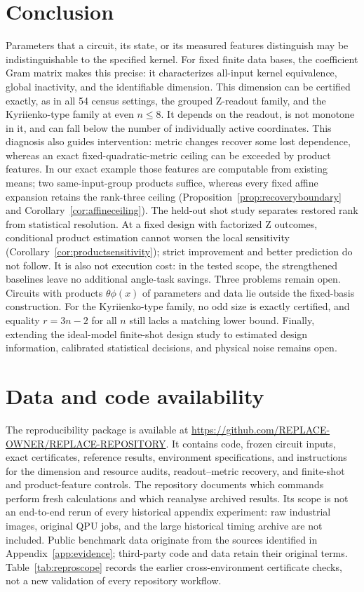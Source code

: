 \documentclass[a4paper,twocolumn,11pt,unpublished]{quantumarticle}
\begin{document}
\section{Conclusion}
Parameters that a circuit, its state, or its measured features
distinguish may be indistinguishable to the specified kernel. For
fixed finite data bases, the coefficient Gram matrix makes this
precise: it characterizes all-input kernel equivalence, global
inactivity, and the identifiable dimension. This dimension can be
certified exactly, as in all 54 census settings, the grouped Z-readout
family, and the Kyriienko-type family at even $n\le8$. It depends on
the readout, is not monotone in it, and can fall below the number of
individually active coordinates. This diagnosis also guides intervention:
metric changes recover some lost dependence, whereas an exact
fixed-quadratic-metric ceiling can be exceeded by product features.
In our exact example those features are computable from existing means;
two same-input-group products suffice, whereas every fixed affine
expansion retains the rank-three ceiling
(Proposition~\ref{prop:recoveryboundary} and Corollary~\ref{cor:affineceiling}).
The held-out shot study separates restored rank from statistical
resolution. At a fixed design with factorized Z outcomes, conditional
product estimation cannot worsen the local sensitivity
(Corollary~\ref{cor:productsensitivity}); strict improvement and better
prediction do not follow. It is also not execution cost: in the
tested scope, the strengthened baselines leave no additional
angle-task savings. Three problems remain open. Circuits with
products $\theta\phi(x)$ of parameters and data lie outside the fixed-basis
construction. For the Kyriienko-type family, no odd size is exactly
certified, and equality $r=3n-2$ for all $n$ still lacks a matching
lower bound. Finally, extending the ideal-model finite-shot design
study to estimated design information, calibrated statistical decisions,
and physical noise remains open.

\section*{Data and code availability}
The reproducibility package is available at
\url{https://github.com/REPLACE-OWNER/REPLACE-REPOSITORY}.
It contains code, frozen circuit inputs, exact certificates,
reference results, environment specifications, and instructions for
the dimension and resource audits, readout--metric recovery, and
finite-shot and product-feature controls. The repository documents
which commands perform fresh calculations and which reanalyse
archived results. Its scope is not an end-to-end rerun of every
historical appendix experiment: raw industrial images, original QPU
jobs, and the large historical timing archive are not included.
Public benchmark data originate from the sources identified in
Appendix~\ref{app:evidence}; third-party code and data retain their
original terms. Table~\ref{tab:reproscope} records the earlier
cross-environment certificate checks, not a new validation of every
repository workflow.
\end{document}
